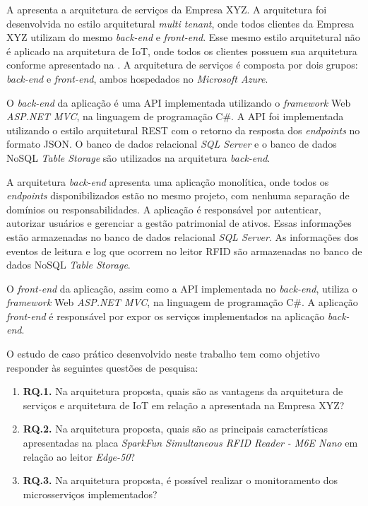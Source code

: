 
A  apresenta a arquitetura de serviços da Empresa XYZ. A arquitetura foi desenvolvida no estilo arquitetural \textit{multi tenant}, onde todos clientes da Empresa XYZ utilizam do mesmo \textit{back-end} e \textit{front-end}. Esse mesmo estilo arquitetural não é aplicado na arquitetura de \acrshort{IoT}, onde todos os clientes possuem sua arquitetura conforme apresentado na . A arquitetura de serviços é composta por dois grupos: \textit{back-end} e \textit{front-end}, ambos hospedados no \textit{Microsoft Azure}.

O \textit{back-end} da aplicação é uma \acrshort{API} implementada utilizando o \textit{framework} Web \textit{ASP.NET MVC}, na linguagem de programação C\#. A \acrshort{API} foi implementada utilizando o estilo arquitetural \acrshort{REST} com o retorno da resposta dos \textit{endpoints} no formato \acrshort{JSON}. O banco de dados relacional \textit{SQL Server} e o banco de dados \acrshort{NoSQL} \textit{Table Storage} são utilizados na arquitetura \textit{back-end}.

A arquitetura \textit{back-end} apresenta uma aplicação monolítica, onde todos os \textit{endpoints} disponibilizados estão no mesmo projeto, com nenhuma separação de domínios ou responsabilidades. A aplicação é responsável por autenticar, autorizar usuários e gerenciar a gestão patrimonial de ativos. Essas informações estão armazenadas no banco de dados relacional \textit{SQL Server}. As informações dos eventos de leitura e log que ocorrem no leitor \acrshort{RFID} são armazenadas no banco de dados \acrshort{NoSQL} \textit{Table Storage}.

O \textit{front-end} da aplicação, assim como a \acrshort{API} implementada no \textit{back-end}, utiliza o \textit{framework} Web \textit{ASP.NET MVC}, na linguagem de programação C\#. A aplicação \textit{front-end} é responsável por expor os serviços implementados na aplicação \textit{back-end}.


O estudo de caso prático desenvolvido neste trabalho tem como objetivo responder às seguintes questões de pesquisa:

\begin{enumerate}
    \item \textbf{RQ.1.} Na arquitetura proposta, quais são as vantagens da arquitetura de serviços e arquitetura de \acrshort{IoT} em relação a apresentada na Empresa XYZ?
    \item \textbf{RQ.2.} Na arquitetura proposta, quais são as principais características apresentadas na placa \textit{SparkFun Simultaneous RFID Reader - M6E Nano} em relação ao leitor \textit{Edge-50}?
    \item \textbf{RQ.3.} Na arquitetura proposta, é possível realizar o monitoramento dos microsserviços implementados?
\end{enumerate}


